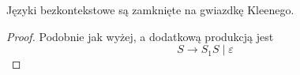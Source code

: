 \begin{theorem}
    Języki bezkontekstowe są zamknięte na gwiazdkę Kleenego.
\end{theorem}
\begin{proof}
    Podobnie jak wyżej, a dodatkową produkcją jest 
    \[
        S \rightarrow S_1S \mid \varepsilon
    \]
\end{proof}

